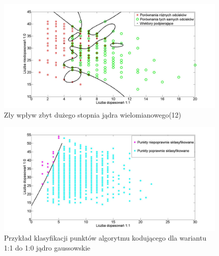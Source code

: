     \begin{figure}[!htb]
    \begin{center}
		\includegraphics[angle=0,scale=0.27]{img/bad_st_12.jpg}
		\caption{Zły wpływ zbyt dużego stopnia jądra wielomianowego(12)}
		\label{img:best_SVM}
    \end{center}
    \end{figure} 
    
    \begin{figure}
    \begin{center}
		\includegraphics[angle=0,scale=0.27]{img/3D_best_score.jpg}
		\caption{Przykład klasyfikacji punktów algorytmu kodującego dla wariantu 1:1 do 1:0 jądro gaussowskie}
		\label{img:bad_SVM}
    \end{center}
    \end{figure} 
    
